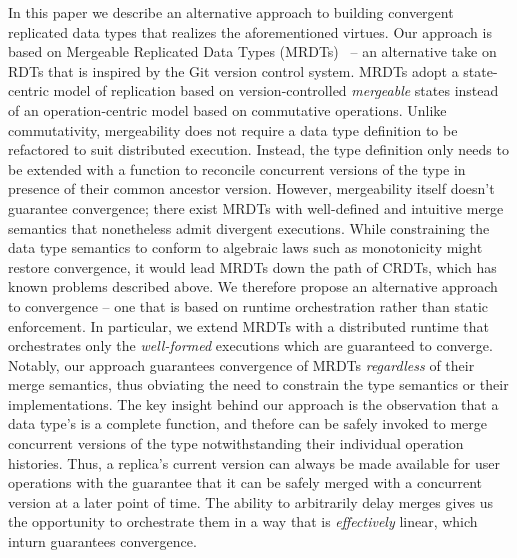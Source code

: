 In this paper we describe an alternative approach to building
convergent replicated data types that realizes the aforementioned
virtues. Our approach is based on Mergeable Replicated Data Types
(MRDTs)~\cite{mrdt} -- an alternative take on RDTs that is inspired by
the Git version control system. MRDTs adopt a state-centric model of
replication based on version-controlled \emph{mergeable} states
instead of an operation-centric model based on commutative operations.
Unlike commutativity, mergeability does not require a data type
definition to be refactored to suit distributed execution. Instead,
the type definition only needs to be extended with a 
function to reconcile concurrent versions of the type in presence of
their common ancestor version. However, mergeability itself doesn't
guarantee convergence; there exist MRDTs with well-defined and
intuitive merge semantics that nonetheless admit divergent executions.
While constraining the data type semantics to conform to algebraic
laws such as monotonicity might restore convergence, it would lead
MRDTs down the path of CRDTs, which has known problems described
above. We therefore propose an alternative approach to convergence --
one that is based on runtime orchestration rather than static
enforcement. In particular, we extend MRDTs with a distributed runtime
that orchestrates only the \emph{well-formed} executions which are
guaranteed to converge. Notably, our approach guarantees convergence
of MRDTs \emph{regardless} of their merge semantics, thus obviating
the need to constrain the type semantics or their implementations. The
key insight behind our approach is the observation that a data type's
 is a complete function, and thefore can be safely invoked to
merge concurrent versions of the type notwithstanding their individual
operation histories. Thus, a replica's current version
can always be made available for user operations with the guarantee
that it can be safely merged with a concurrent version at a later
point of time. The ability to arbitrarily delay merges gives us the
opportunity to orchestrate them in a way that is \emph{effectively}
linear, which inturn guarantees convergence.

